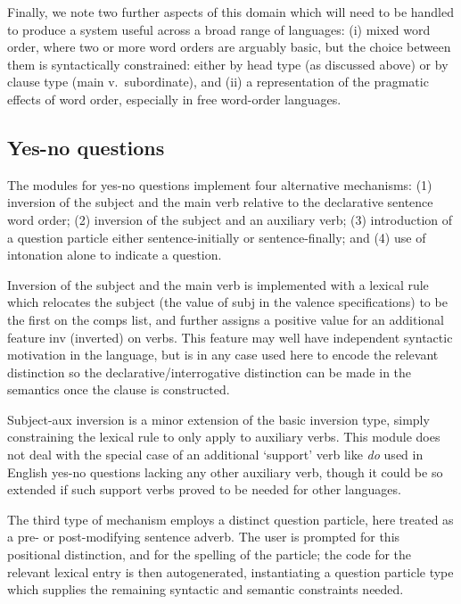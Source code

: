 \documentclass[11pt]{article}
\begin{document}
Finally, we note two further aspects of this domain which will need
to be handled to produce a system useful across a broad range of
languages: (i) mixed word order, where two or more word
orders are arguably basic, but the choice between them is syntactically
constrained: either by head type (as discussed above) or by clause
type (main v.\ subordinate), and (ii) a representation of the
pragmatic effects of word order, especially in free word-order
languages.


\subsection{Yes-no questions}

The modules for yes-no questions implement four alternative mechanisms:
(1) inversion of the subject and the main verb relative to the declarative
sentence word order; (2) inversion of the subject and an auxiliary
verb; (3) introduction of a question particle either sentence-initially or
sentence-finally; and (4) use of intonation alone to indicate a question.

Inversion of the subject and the main verb is implemented with a lexical
rule which relocates the subject (the value of {\sc subj} in the valence
specifications) to be the first on the {\sc comps} list, and further
assigns a positive value for an additional feature {\sc inv} (inverted)
on verbs.  This feature may well have independent syntactic motivation in 
the language, but is in any case used here to encode the relevant distinction
so the declarative/interrogative distinction can be made in the semantics
once the clause is constructed.

Subject-aux inversion is a minor extension of the basic inversion type,
simply constraining the lexical rule to only apply to auxiliary verbs.
This module does not deal with the special case of an additional `support'
verb like {\it do} used in English yes-no questions lacking any other
auxiliary verb, though it could be so extended if such support verbs
proved to be needed for other languages.

The third type of mechanism employs a distinct question particle, here
treated as a pre- or post-modifying sentence adverb.  The user is
prompted for this positional distinction, and for the spelling of the
particle; the code for the relevant lexical entry is then
autogenerated, instantiating a question particle type which supplies
the remaining syntactic and semantic constraints needed.
\end{document}
